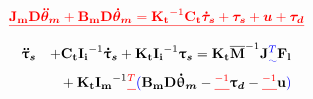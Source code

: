 \setlength{\arraycolsep}{0.0em}
\DIFdelbegin \begin{displaymath}\DIFdel{
\vectm{ J_m  D } \vects{ \ddot{\theta}_m} + \vectm{B_m D}\vects{\dot{\theta}_m} = \vectm{K_t}^{-1} \vectm{C_t}\vects{ \dot{\tau}_s} + \vects{\tau_s} + \vects{u} + \vects{\tau_d}
\label{eq:dynamics_eq1}
}\end{displaymath}
\DIFdelend %
\begin{eqnarray}
\label{eq:dynamics_eq2}
\DIFdelbegin %
\DIFdelend \DIFaddbegin \vects{\ddot{\uptau}_s} \DIFaddend && + \DIFdelbegin %
\DIFdelend \DIFaddbegin \vectm{C_t I_i}\DIFaddend ^{-1} \DIFdelbegin %
\DIFdelend \DIFaddbegin \vects{\dot{\uptau}_s} \DIFaddend + \DIFdelbegin %
\DIFdelend \DIFaddbegin \vectm{K_t I_i}\DIFaddend ^{-1} \DIFdelbegin %
\DIFdelend \DIFaddbegin \vects{\uptau_s} \DIFaddend =\DIFdelbegin %
\DIFdelend \DIFaddbegin \vectm{K_t } \overline{\vectm{M}}\DIFaddend ^{-1} \DIFdelbegin %
\DIFdelend \DIFaddbegin \vectm{ J}\DIFadd{^T }\vect{F_l}  \DIFaddend \nonumber \\
&&{+}\:   \DIFdelbegin %
\DIFdelend \DIFaddbegin \vectm{K_t   I_m}\DIFaddend ^{-1} \DIFdelbegin %
\DIFdel{^T }%
\DIFdelend \DIFaddbegin \DIFadd{( }\vectm{B_m D}\vects{\dot{\uptheta}_m}  \DIFaddend -  \DIFdelbegin %
\DIFdel{^{-1} }%
\DIFdelend \DIFaddbegin \vects{\uptau_d} \DIFaddend - \DIFdelbegin %
\DIFdel{^{-1} }%
\DIFdelend \DIFaddbegin \vect{u}\DIFadd{)
}\DIFaddend \end{eqnarray}
\setlength{\arraycolsep}{5pt}


